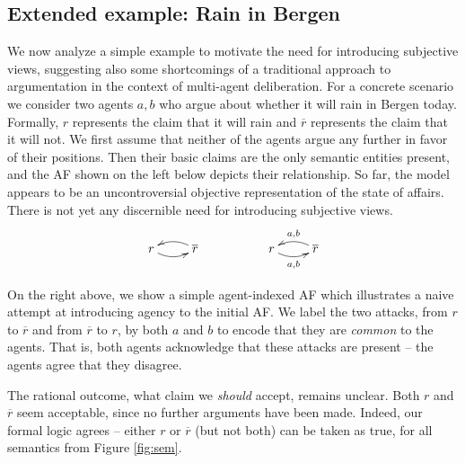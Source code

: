 \documentclass[greybox]{svmult}
\renewcommand{\bar}[1]{\overline{#1}}
\begin{document}
\subsection{Extended example: Rain in Bergen}\label{ex:run}

We now analyze a simple example to motivate the need for introducing subjective views, suggesting also some shortcomings of a traditional approach to argumentation in the context of multi-agent deliberation. For a concrete scenario we consider two agents $a,b$ who argue about whether it will rain in Bergen today. Formally, $r$ represents the claim that it will rain and $\overline r$ represents the claim that it will not. We first assume that neither of the agents argue any further in favor of their positions. Then their basic claims are the only semantic entities present, and the AF shown on the left below depicts their relationship. So far, the model appears to be an uncontroversial objective representation of the state of affairs. There is not yet any discernible need for introducing subjective views. 
$$\begin{array}{ccc}
\xymatrix{ r \ar@/_/[r] & \overline r \ar@/_/[l] } & \hspace{3em} &
\xymatrix{ r \ar@/_/[r]_{{ a},{ b}} & \bar r \ar@/_/[l]_{{ a},{ b}} }
\end{array}$$

On the right above, we show a simple agent-indexed AF which illustrates a naive attempt at introducing agency to the initial AF. We label the two attacks, from $r$ to $\overline r$ and from $\overline r$ to $r$, by both $a$ and $b$ to encode that they are \emph{common} to the agents. That is, both agents acknowledge that these attacks are present -- the agents agree that they disagree.

The rational outcome, what claim we \emph{should} accept, remains unclear. Both $r$ and $\bar r$ seem acceptable, since no further arguments have been made. Indeed, our formal logic agrees -- either $r$ or $\bar r$ (but not both) can be taken as true, for all semantics from Figure \ref{fig:sem}.
\end{document}
